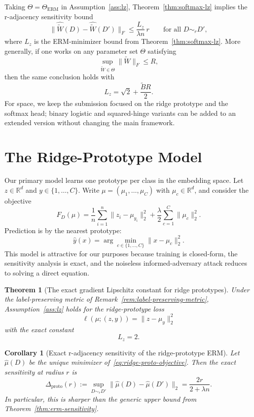 \documentclass[conference,compsoc]{IEEEtran}
\newtheorem{theorem}{Theorem}
\newtheorem{corollary}{Corollary}
\begin{document}
Taking $\Theta=\Theta_{\mathrm{ERM}}$ in Assumption~\ref{ass:lz}, Theorem~\ref{thm:softmax-lz} implies the r-adjacency sensitivity bound
\[
\|\widehat{\widetilde W}(D)-\widehat{\widetilde W}(D')\|_F
\le
\frac{L_z}{\lambda n}\,r
\qquad \text{for all }D\sim_r D',
\]
where $L_z$ is the ERM-minimizer bound from Theorem~\ref{thm:softmax-lz}. More generally, if one works on any parameter set $\Theta$ satisfying
\[
\sup_{\widetilde W\in\Theta}\|\widetilde W\|_F\le R,
\]
then the same conclusion holds with
\[
L_z=\sqrt{2}+\frac{\widetilde B R}{2}.
\]
For space, we keep the submission focused on the ridge prototype and the softmax head; binary logistic and squared-hinge variants can be added to an extended version without changing the main framework.

\section{The Ridge-Prototype Model}
\label{sec:ridge}

Our primary model learns one prototype per class in the embedding space. Let $z\in\mathbb{R}^d$ and $y\in\{1,\dots,C\}$. Write $\mu=(\mu_1,\dots,\mu_C)$ with $\mu_c\in\mathbb{R}^d$, and consider the objective
\begin{equation}
\label{eq:ridge-proto-objective}
F_D(\mu)=\frac{1}{n}\sum_{i=1}^n \|z_i-\mu_{y_i}\|_2^2+\frac{\lambda}{2}\sum_{c=1}^C \|\mu_c\|_2^2.
\end{equation}
Prediction is by the nearest prototype:
\[
\widehat y(x)=\arg\min_{c\in\{1,\dots,C\}} \|x-\mu_c\|_2^2.
\]
This model is attractive for our purposes because training is closed-form, the sensitivity analysis is exact, and the noiseless informed-adversary attack reduces to solving a direct equation.

\begin{theorem}[The exact gradient Lipschitz constant for ridge prototypes]
\label{thm:proto-lz}
Under the label-preserving metric of Remark~\ref{rem:label-preserving-metric}, Assumption~\ref{ass:lz} holds for the ridge-prototype loss
\[
\ell(\mu;(z,y))=\|z-\mu_y\|_2^2
\]
with the exact constant
\[
L_z=2.
\]
\end{theorem}

\begin{corollary}[Exact r-adjacency sensitivity of the ridge-prototype ERM]
\label{cor:proto-sensitivity}
Let $\widehat\mu(D)$ be the unique minimizer of~\eqref{eq:ridge-proto-objective}. Then the exact sensitivity at radius $r$ is
\[
\Delta_{\mathrm{proto}}(r)
:=
\sup_{D\sim_r D'} \|\widehat\mu(D)-\widehat\mu(D')\|_2
=
\frac{2r}{2+\lambda n}.
\]
In particular, this is sharper than the generic upper bound from Theorem~\ref{thm:erm-sensitivity}.
\end{corollary}
\end{document}
